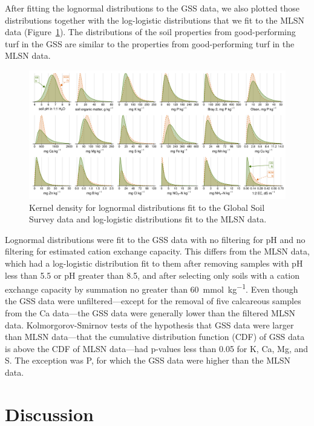 \documentclass[12pt, a4paper, titlepage]{article}
\begin{document}
  After fitting the lognormal distributions to the GSS data, we also plotted those distributions together with the log-logistic distributions that we fit \parencite{woods-peerj-2016} to the MLSN data (Figure~\ref{fig:density_both}). The distributions of the soil properties from good-performing turf in the GSS are similar to the properties from good-performing turf in the MLSN data.

     \begin{figure}
    \centering
    \includegraphics[width=1.01\linewidth]{fig3_compare_exact.png}
    \caption{Kernel density for lognormal distributions fit to the Global Soil Survey data and log-logistic distributions fit to the MLSN data.}
    \label{fig:density_both}
  \end{figure}

Lognormal distributions were fit to the GSS data with no filtering for pH and no filtering for estimated cation exchange capacity. This differs from the MLSN data, which had a log-logistic distribution fit to them after removing samples with pH less than 5.5 or pH greater than 8.5, and after selecting only soils with a cation exchange capacity by summation no greater than \SI{60}{\milli\mole\per\kg}. Even though the GSS data were unfiltered---except for the removal of five calcareous samples from the Ca data---the GSS data were generally lower than the filtered MLSN data. Kolmorgorov-Smirnov tests of the hypothesis that GSS data were larger than MLSN data---that the cumulative distribution function (CDF) of GSS data is above the CDF of MLSN data---had p-values less than 0.05 for K, Ca, Mg, and S. The exception was P, for which the GSS data were higher than the MLSN data. 

\section*{Discussion}
\end{document}
